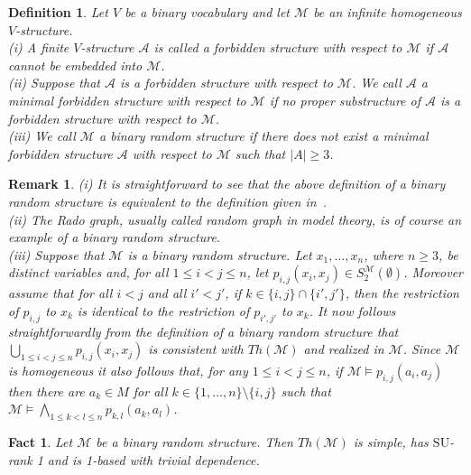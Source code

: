 \documentclass[11pt, twoside]{amsart}
\newtheorem{defin}[theor]{Definition}
\newtheorem{rem}[theor]{Remark}
\newtheorem{fact}[theor]{Fact}
\numberwithin{equation}{section}
\newcommand{\es}{\emptyset}
\newcommand{\su}{\mathrm{SU}}
\newcommand{\mcA}{\mathcal{A}}
\newcommand{\mcM}{\mathcal{M}}
\begin{document}
\begin{defin}\label{definition of a binary random structure}{\rm
Let $V$ be a binary vocabulary and let $\mcM$ be an infinite homogeneous $V$-structure.\\
(i) A finite $V$-structure $\mcA$ is called a {\em forbidden structure with respect to $\mcM$}
if $\mcA$ cannot be embedded into $\mcM$.\\
(ii) Suppose that $\mcA$ is a forbidden structure with respect to $\mcM$.
We call $\mcA$ a {\em minimal} forbidden structure with respect to $\mcM$ if 
no proper substructure of $\mcA$ is a forbidden structure with respect to $\mcM$.\\
(iii) We call {\em $\mcM$ a binary random structure} if there does {\em not} exist a minimal forbidden structure $\mcA$ with
respect to $\mcM$ such that $|A| \geq 3$.
}\end{defin}

\begin{rem}\label{remarks about binary random structures}{\rm
(i) It is straightforward to see that the above definition of a binary random structure is equivalent
to the definition given in~\cite[Section~2.3]{AK14}.\\
(ii) The Rado graph, usually called random graph in model theory, is of course an example of a binary random structure.\\
(iii) Suppose that $\mcM$ is a binary random structure. Let $x_1, \ldots, x_n$, where $n \geq 3$, be distinct variables
and, for all $1 \leq i < j \leq n$, let $p_{i, j}(x_i, x_j) \in S^\mcM_2(\es)$.
Moreover assume that for all $i < j$ and all $i' < j'$, if $k \in \{i, j\} \cap \{i', j'\}$, then
the restriction of $p_{i,j}$ to $x_k$ is identical to the restriction of $p_{i',j'}$ to $x_k$.
It now follows straightforwardly from the definition of a binary random structure that 
$\bigcup_{1 \leq i < j \leq n} p_{i, j}(x_i, x_j)$ is consistent with $Th(\mcM)$ and realized in $\mcM$.
Since $\mcM$ is homogeneous it also follows that, for any $1 \leq i < j \leq n$, 
if $\mcM \models p_{i,j}(a_i, a_j)$ then there are
$a_k \in M$ for all $k \in \{1, \ldots, n\} \setminus \{i, j\}$ such that 
$\mcM \models \bigwedge_{1 \leq k < l \leq n} p_{k, l}(a_k, a_l)$.
}\end{rem}






\begin{fact}\label{properties of binary random structures}
Let $\mcM$ be a binary random structure.
Then $Th(\mcM)$ is simple, has $\su$-rank 1 and is 1-based with trivial dependence.
\end{fact}
\end{document}
